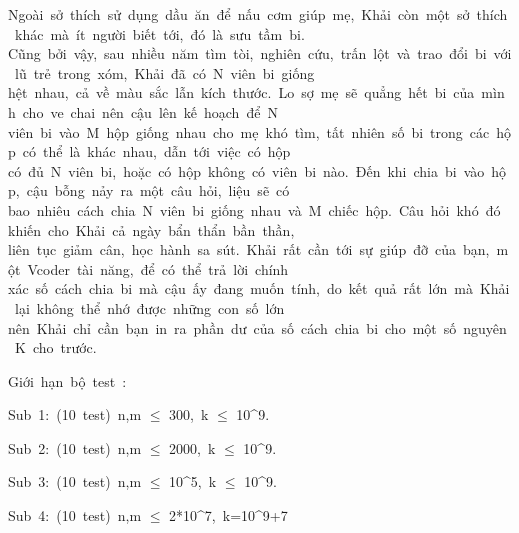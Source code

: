 Ngoài sở thích sử dụng dầu ăn để nấu cơm giúp mẹ, Khải còn một sở thích khác mà ít người biết tới, đó là sưu tầm bi. Cũng bởi vậy, sau nhiều năm tìm tòi, nghiên cứu, trấn lột và trao đổi bi với lũ trẻ trong xóm, Khải đã có N viên bi giống hệt nhau, cả về màu sắc lẫn kích thước. Lo sợ mẹ sẽ quẳng hết bi của mình cho ve chai nên cậu lên kế hoạch để N viên bi vào M hộp giống nhau cho mẹ khó tìm, tất nhiên số bi trong các hộp có thể là khác nhau, dẫn tới việc có hộp có đủ N viên bi, hoặc có hộp không có viên bi nào. Đến khi chia bi vào hộp, cậu bỗng nảy ra một câu hỏi, liệu sẽ có bao nhiêu cách chia N viên bi giống nhau và M chiếc hộp. Câu hỏi khó đó khiến cho Khải cả ngày bẩn thẩn bần thần, liên tục giảm cân, học hành sa sút. Khải rất cần tới sự giúp đỡ của bạn, một Vcoder tài năng, để có thể trả lời chính xác số cách chia bi mà cậu ấy đang muốn tính, do kết quả rất lớn mà Khải lại không thể nhớ được những con số lớn nên Khải chỉ cần bạn in ra phần dư của số cách chia bi cho một số nguyên K cho trước.  



   Giới hạn bộ test :  

   Sub 1: (10 test) n,m $\le$ 300, k $\le$ 10^9.  

   Sub 2: (10 test) n,m $\le$ 2000, k $\le$ 10^9.  

   Sub 3: (10 test) n,m $\le$ 10^5, k $\le$ 10^9.  

   Sub 4: (10 test) n,m $\le$ 2*10^7, k=10^9+7